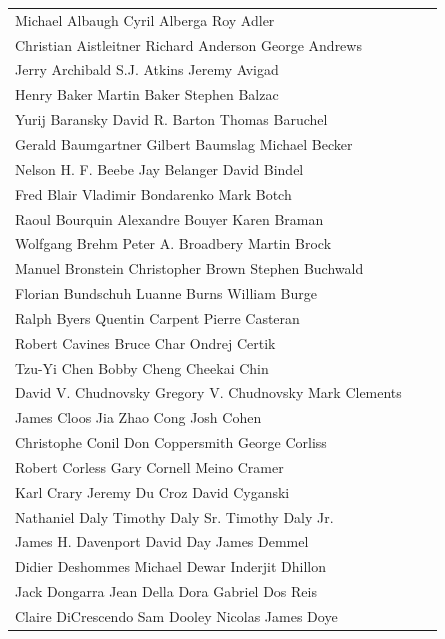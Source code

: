 \begin{tabular}{lll}
Michael Albaugh        Cyril Alberga          Roy Adler\\
Christian Aistleitner  Richard Anderson       George Andrews\\
Jerry Archibald        S.J. Atkins            Jeremy Avigad\\
Henry Baker            Martin Baker           Stephen Balzac\\
Yurij Baransky         David R. Barton        Thomas Baruchel\\
Gerald Baumgartner     Gilbert Baumslag       Michael Becker\\
Nelson H. F. Beebe     Jay Belanger           David Bindel\\
Fred Blair             Vladimir Bondarenko    Mark Botch\\
Raoul Bourquin         Alexandre Bouyer       Karen Braman\\
Wolfgang Brehm         Peter A. Broadbery     Martin Brock\\
Manuel Bronstein       Christopher Brown      Stephen Buchwald\\
Florian Bundschuh      Luanne Burns           William Burge\\
Ralph Byers            Quentin Carpent        Pierre Casteran\\
Robert Cavines         Bruce Char             Ondrej Certik\\
Tzu-Yi Chen            Bobby Cheng            Cheekai Chin\\
David V. Chudnovsky    Gregory V. Chudnovsky  Mark Clements\\
James Cloos            Jia Zhao Cong          Josh Cohen\\
Christophe Conil       Don Coppersmith        George Corliss\\
Robert Corless         Gary Cornell           Meino Cramer\\
Karl Crary             Jeremy Du Croz         David Cyganski\\
Nathaniel Daly         Timothy Daly Sr.       Timothy Daly Jr.\\
James H. Davenport     David Day              James Demmel\\
Didier Deshommes       Michael Dewar          Inderjit Dhillon\\
Jack Dongarra          Jean Della Dora        Gabriel Dos Reis\\
Claire DiCrescendo     Sam Dooley             Nicolas James Doye\\

\end{tabular}
